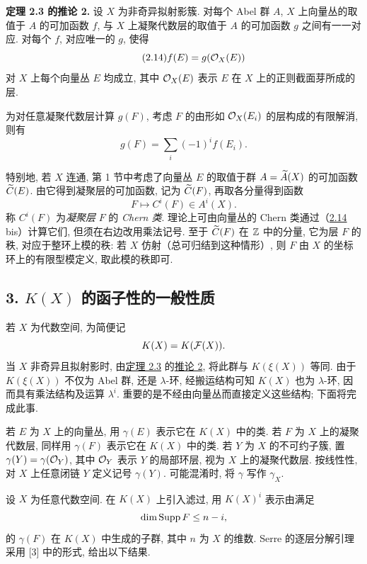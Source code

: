 \textbf{定理 2.3 的推论 2.} 设 $X$ 为非奇异拟射影簇. 对每个 Abel 群 $A$, $X$ 上向量丛的取值于 $A$ 的可加函数 $f$, 与 $X$ 上凝聚代数层的取值于 $A$ 的可加函数 $g$ 之间有一一对应. 对每个 $f$, 对应唯一的 $g$, 使得
\begin{equation}\tag{2.14}
 f(E)=g(\mathcal O_X(E))
\end{equation}
对 $X$ 上每个向量丛 $E$ 均成立, 其中 $\mathcal O_X(E)$ 表示 $E$ 在 $X$ 上的正则截面芽所成的层.

为对任意凝聚代数层计算 $g(F)$, 考虑 $F$ 的由形如 $\mathcal O_X(E_i)$ 的层构成的有限解消, 则有
\begin{equation}\tag{2.14 bis}
 g(F)=\sum_i (-1)^i f(E_i).
\end{equation}

特别地, 若 $X$ 连通, 第 1 节中考虑了向量丛 $E$ 的取值于群 $A=\widetilde A(X)$ 的可加函数 $\widetilde C(E)$. 由它得到凝聚层的可加函数, 记为 $\widetilde C(F)$, 再取各分量得到函数
\[
 F\longmapsto C^i(F)\in A^i(X).
\]
称 $C^i(F)$ 为\emph{凝聚层} $F$ 的 \emph{Chern 类}. 理论上可由向量丛的 Chern 类通过（\hyperlink{sga6.e00.eq.2-14}{2.14} bis）计算它们, 但须在右边改用乘法记号. 至于 $\widetilde C(F)$ 在 $\mathbb Z$ 中的分量, 它为层 $F$ 的秩, 对应于整环上模的秩: 若 $X$ 仿射（总可归结到这种情形）, 则 $F$ 由 $X$ 的坐标环上的有限型模定义, 取此模的秩即可.

\subsection*{3. $K(X)$ 的函子性的一般性质}

若 $X$ 为代数空间, 为简便记
\[
 K(X)=K(\mathcal F(X)).
\]
当 $X$ 非奇异且拟射影时, 由\hyperlink{sga6.e00.thm.2-3}{定理 2.3} 的\hyperlink{sga6.e00.cor.2}{推论 2}, 将此群与 $K(\xi(X))$ 等同. 由于 $K(\xi(X))$ 不仅为 Abel 群, 还是 $\lambda$-环, 经搬运结构可知 $K(X)$ 也为 $\lambda$-环, 因而具有乘法结构及运算 $\lambda^i$. 重要的是不经由向量丛而直接定义这些结构; 下面将完成此事.

若 $E$ 为 $X$ 上的向量丛, 用 $\gamma(E)$ 表示它在 $K(X)$ 中的类. 若 $F$ 为 $X$ 上的凝聚代数层, 同样用 $\gamma(F)$ 表示它在 $K(X)$ 中的类. 若 $Y$ 为 $X$ 的不可约子簇, 置 $\gamma(Y)=\gamma(\mathcal O_Y)$, 其中 $\mathcal O_Y$ 表示 $Y$ 的局部环层, 视为 $X$ 上的凝聚代数层. 按线性性, 对 $X$ 上任意闭链 $Y$ 定义记号 $\gamma(Y)$. 可能混淆时, 将 $\gamma$ 写作 $\gamma_X$.

设 $X$ 为任意代数空间. 在 $K(X)$ 上引入滤过, 用 $K(X)^i$ 表示由满足
\[
 \dim \operatorname{Supp} F\leq n-i,
\]
的 $\gamma(F)$ 在 $K(X)$ 中生成的子群, 其中 $n$ 为 $X$ 的维数. Serre 的逐层分解引理采用 [3] 中的形式, 给出以下结果.

